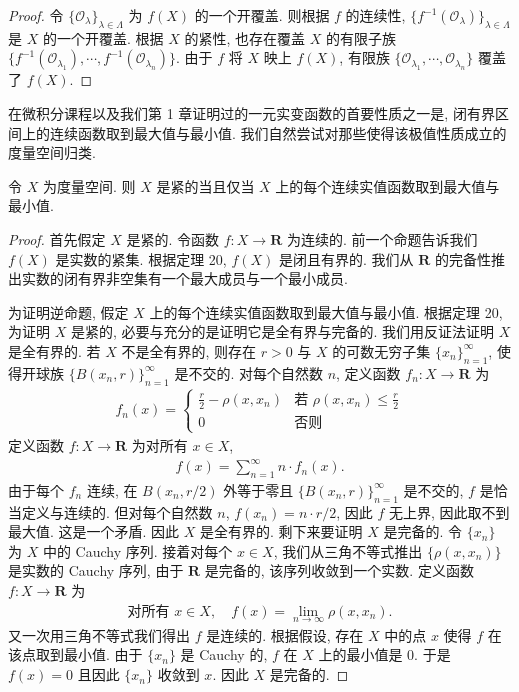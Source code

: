 \documentclass[../../main.tex]{subfiles}
\begin{document}
\begin{proof}
令 $\{\mathcal{O}_{\lambda}\}_{\lambda\in\Lambda}$ 为 $f(X)$ 的一个开覆盖. 则根据 $f$ 的连续性, $\{f^{-1}(\mathcal{O}_{\lambda})\}_{\lambda\in\Lambda}$ 是 $X$ 的一个开覆盖. 根据 $X$ 的紧性, 也存在覆盖 $X$ 的有限子族 $\{f^{-1}(\mathcal{O}_{\lambda_{1}}),\cdots,f^{-1}(\mathcal{O}_{\lambda_{n}})\}$. 由于 $f$ 将 $X$ 映上 $f(X)$, 有限族 $\{\mathcal{O}_{\lambda_{1}},\cdots,\mathcal{O}_{\lambda_{n}}\}$ 覆盖了 $f(X)$.
\end{proof}

在微积分课程以及我们第 1 章证明过的一元实变函数的首要性质之一是, 闭有界区间上的连续函数取到最大值与最小值. 我们自然尝试对那些使得该极值性质成立的度量空间归类.

\begin{theorem}\label{theorem:ch09-紧集连续函数取极值}
令 $X$ 为度量空间. 则 $X$ 是紧的当且仅当 $X$ 上的每个连续实值函数取到最大值与最小值.
\end{theorem}

\begin{proof}
首先假定 $X$ 是紧的. 令函数 $f:X\to\mathbf{R}$ 为连续的. 前一个命题告诉我们 $f(X)$ 是实数的紧集. 根据定理 20, $f(X)$ 是闭且有界的. 我们从 $\mathbf{R}$ 的完备性推出实数的闭有界非空集有一个最大成员与一个最小成员.

为证明逆命题, 假定 $X$ 上的每个连续实值函数取到最大值与最小值. 根据定理 20, 为证明 $X$ 是紧的, 必要与充分的是证明它是全有界与完备的. 我们用反证法证明 $X$ 是全有界的. 若 $X$ 不是全有界的, 则存在 $r>0$ 与 $X$ 的可数无穷子集 $\{x_{n}\}_{n=1}^{\infty}$, 使得开球族 $\{B(x_{n},r)\}_{n=1}^{\infty}$ 是不交的. 对每个自然数 $n$, 定义函数 $f_{n}:X\to\mathbf{R}$ 为
\begin{align*}
f_{n}(x)=\begin{cases}
\frac{r}{2}-\rho(x,x_{n}) & \text{若 }\rho(x,x_{n})\leqslant\frac{r}{2}\\
0 & \text{否则}
\end{cases}
\end{align*}
定义函数 $f:X\to\mathbf{R}$ 为对所有 $x\in X$,
\begin{align*}
f(x)=\sum_{n=1}^{\infty}n\cdot f_{n}(x).
\end{align*}
由于每个 $f_{n}$ 连续, 在 $B(x_{n},r/2)$ 外等于零且 $\{B(x_{n},r)\}_{n=1}^{\infty}$ 是不交的, $f$ 是恰当定义与连续的. 但对每个自然数 $n$, $f(x_{n})=n\cdot r/2$, 因此 $f$ 无上界, 因此取不到最大值. 这是一个矛盾. 因此 $X$ 是全有界的. 剩下来要证明 $X$ 是完备的. 令 $\{x_{n}\}$ 为 $X$ 中的 Cauchy 序列. 接着对每个 $x\in X$, 我们从三角不等式推出 $\{\rho(x,x_{n})\}$ 是实数的 Cauchy 序列, 由于 $\mathbf{R}$ 是完备的, 该序列收敛到一个实数. 定义函数 $f:X\to\mathbf{R}$ 为
\begin{align*}
\text{对所有 }x\in X,\quad f(x)=\lim_{n\to\infty}\rho(x,x_{n}).
\end{align*}
又一次用三角不等式我们得出 $f$ 是连续的. 根据假设, 存在 $X$ 中的点 $x$ 使得 $f$ 在该点取到最小值. 由于 $\{x_{n}\}$ 是 Cauchy 的, $f$ 在 $X$ 上的最小值是 $0$. 于是 $f(x)=0$ 且因此 $\{x_{n}\}$ 收敛到 $x$. 因此 $X$ 是完备的.
\end{proof}
\end{document}
